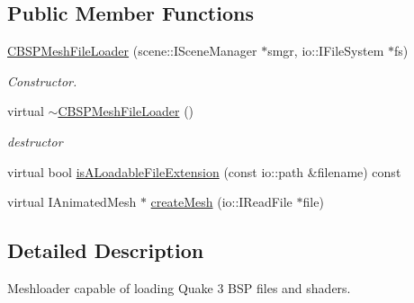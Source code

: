 \subsection*{Public Member Functions}
\begin{DoxyCompactItemize}
\item 
\hypertarget{classirr_1_1scene_1_1_c_b_s_p_mesh_file_loader_ad84d8661ae0924a6cc22a62b946b5952}{\hyperlink{classirr_1_1scene_1_1_c_b_s_p_mesh_file_loader_ad84d8661ae0924a6cc22a62b946b5952}{C\-B\-S\-P\-Mesh\-File\-Loader} (scene\-::\-I\-Scene\-Manager $\ast$smgr, io\-::\-I\-File\-System $\ast$fs)}\label{classirr_1_1scene_1_1_c_b_s_p_mesh_file_loader_ad84d8661ae0924a6cc22a62b946b5952}

\begin{DoxyCompactList}\small\item\em Constructor. \end{DoxyCompactList}\item 
\hypertarget{classirr_1_1scene_1_1_c_b_s_p_mesh_file_loader_affee296166c2a11a33111aa8b496beae}{virtual \hyperlink{classirr_1_1scene_1_1_c_b_s_p_mesh_file_loader_affee296166c2a11a33111aa8b496beae}{$\sim$\-C\-B\-S\-P\-Mesh\-File\-Loader} ()}\label{classirr_1_1scene_1_1_c_b_s_p_mesh_file_loader_affee296166c2a11a33111aa8b496beae}

\begin{DoxyCompactList}\small\item\em destructor \end{DoxyCompactList}\item 
virtual bool \hyperlink{classirr_1_1scene_1_1_c_b_s_p_mesh_file_loader_acd3a8ace2ce5bdd3bfe62da333fce4e7}{is\-A\-Loadable\-File\-Extension} (const io\-::path \&filename) const 
\item 
virtual I\-Animated\-Mesh $\ast$ \hyperlink{classirr_1_1scene_1_1_c_b_s_p_mesh_file_loader_a4f58ba51049013d07b69706c699a943a}{create\-Mesh} (io\-::\-I\-Read\-File $\ast$file)
\end{DoxyCompactItemize}


\subsection{Detailed Description}
Meshloader capable of loading Quake 3 B\-S\-P files and shaders. 

